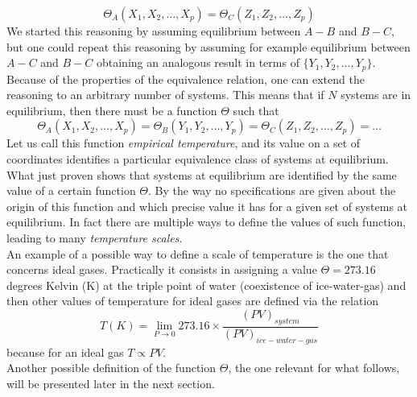 \begin{equation*}
    \Theta_A(X_1, X_2, \dots, X_p) = \Theta_C(Z_1, Z_2, \dots, Z_p)
\end{equation*}
We started this reasoning by assuming equilibrium between $A-B$ and $B-C$, but one could repeat this reasoning by assuming for example
equilibrium between $A-C$ and $B-C$ obtaining an analogous result in terms of $\{Y_1, Y_2, \dots, Y_p\}$. Because of the properties of the equivalence relation,
one can extend the reasoning to an arbitrary number of systems. This means that if $N$ systems are in equilibrium, then there must be a function $\Theta$ such that
\begin{equation*}
    \Theta_A(X_1, X_2, \dots, X_p) = \Theta_B(Y_1, Y_2, \dots, Y_p) = \Theta_C(Z_1, Z_2, \dots, Z_p) = \dots
\end{equation*}
Let us call this function \emph{empirical temperature}, and its value on a set of coordinates identifies a particular equivalence class of systems at equilibrium. \\
What just proven shows that systems at equilibrium are identified by the same value of a certain function $\Theta$. By the way no specifications are given about the origin 
of this function and which precise value it has for a given set of systems at equilibrium. In fact there are multiple ways to define the values of such function, leading
to many \emph{temperature scales}. \\
An example of a possible way to define a scale of temperature is the one that concerns ideal gases. Practically it consists in assigning a value $\Theta = 273.16$ degrees Kelvin (K) at the triple point of water (coexistence of ice-water-gas) and then
other values of temperature for ideal gases are defined via the relation 
\begin{equation*}
    T(K) = \lim_{P \to 0} 273.16 \times \frac{(PV)_{system}}{(PV)_{ice-water-gas}}
\end{equation*}
because for an ideal gas $T \propto PV$. \\
Another possible definition of the function $\Theta$, the one relevant for what follows, will be presented later in the next section.

